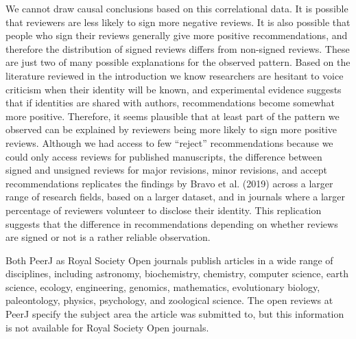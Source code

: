 \documentclass[
  english,
  ,jou, a4paper,floatsintext]{apa6}
\begin{document}
We cannot draw causal conclusions based on this correlational data. It is possible that reviewers are less likely to sign more negative reviews. It is also possible that people who sign their reviews generally give more positive recommendations, and therefore the distribution of signed reviews differs from non-signed reviews. These are just two of many possible explanations for the observed pattern. Based on the literature reviewed in the introduction we know researchers are hesitant to voice criticism when their identity will be known, and experimental evidence suggests that if identities are shared with authors, recommendations become somewhat more positive. Therefore, it seems plausible that at least part of the pattern we observed can be explained by reviewers being more likely to sign more positive reviews. Although we had access to few \enquote{reject} recommendations because we could only access reviews for published manuscripts, the difference between signed and unsigned reviews for major revisions, minor revisions, and accept recommendations replicates the findings by Bravo et al. (2019) across a larger range of research fields, based on a larger dataset, and in journals where a larger percentage of reviewers volunteer to disclose their identity. This replication suggests that the difference in recommendations depending on whether reviews are signed or not is a rather reliable observation.

Both PeerJ as Royal Society Open journals publish articles in a wide range of disciplines, including astronomy, biochemistry, chemistry, computer science, earth science, ecology, engineering, genomics, mathematics, evolutionary biology, paleontology, physics, psychology, and zoological science. The open reviews at PeerJ specify the subject area the article was submitted to, but this information is not available for Royal Society Open journals.

\onecolumn
\end{document}
